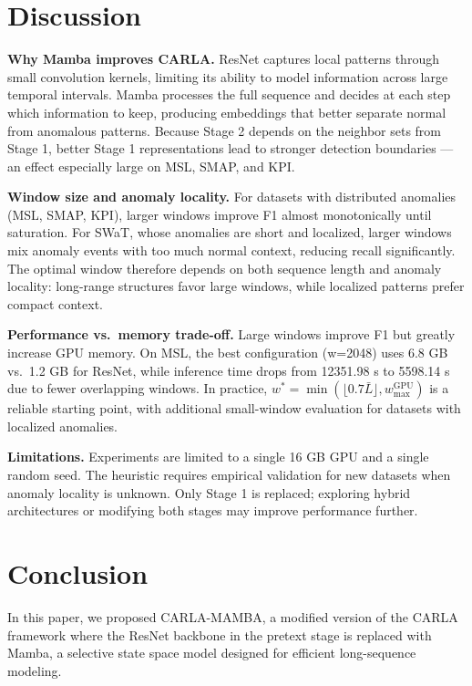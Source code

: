 \documentclass[runningheads]{llncs}
\begin{document}
\section{Discussion}
 
\textbf{Why Mamba improves CARLA.}
ResNet captures local patterns through small convolution kernels, limiting its ability to model information across large temporal intervals. Mamba processes the full sequence and decides at each step which information to keep, producing embeddings that better separate normal from anomalous patterns. Because Stage 2 depends on the neighbor sets from Stage 1, better Stage 1 representations lead to stronger detection boundaries — an effect especially large on MSL, SMAP, and KPI.
 
\textbf{Window size and anomaly locality.}
For datasets with distributed anomalies (MSL, SMAP, KPI), larger windows improve F1 almost monotonically until saturation. For SWaT, whose anomalies are short and localized, larger windows mix anomaly events with too much normal context, reducing recall significantly. The optimal window therefore depends on both sequence length and anomaly locality: long-range structures favor large windows, while localized patterns prefer compact context.
 
\textbf{Performance vs.\ memory trade-off.}
Large windows improve F1 but greatly increase GPU memory. On MSL, the best configuration (w=2048) uses 6.8 GB vs.\ 1.2 GB for ResNet, while inference time drops from 12351.98 s to 5598.14 s due to fewer overlapping windows. In practice, $w^* = \min(\lfloor 0.7\bar{L} \rfloor, w_{\max}^{\text{GPU}})$ is a reliable starting point, with additional small-window evaluation for datasets with localized anomalies.
 
\textbf{Limitations.}
Experiments are limited to a single 16 GB GPU and a single random seed. The heuristic requires empirical validation for new datasets when anomaly locality is unknown. Only Stage 1 is replaced; exploring hybrid architectures or modifying both stages may improve performance further.

\section{Conclusion}

In this paper, we proposed CARLA-MAMBA, a modified version of the CARLA framework where the ResNet backbone in the pretext stage is replaced with Mamba, a selective state space model designed for efficient long-sequence modeling.
\end{document}
